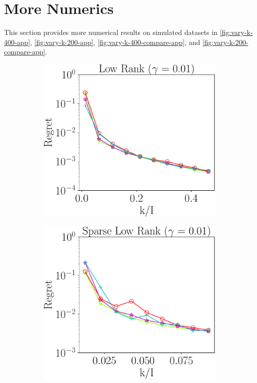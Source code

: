 \section{More Numerics}\label{appendix:more_result}

This section provides more numerical results on simulated datasets
in \ref{fig:vary-k-400-app},
\ref{fig:vary-k-200-app},
\ref{fig:vary-k-400-compare-app},
and \ref{fig:vary-k-200-compare-app}.

\begin{figure}
	\centering
	\begin{subfigure}{0.3\textwidth}
		\includegraphics[scale = 0.24]{figure/fig2_lk_lnoise_400.pdf}
	\end{subfigure}
	\begin{subfigure}{0.3\textwidth}
		\includegraphics[scale = 0.24]{figure/fig2_slk_lnoise_400.pdf}

\end{subfigure}
\end{figure}
